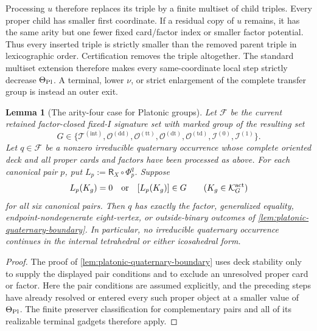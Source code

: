 \documentclass[11pt,letterpaper,onecolumn]{article}
\theoremstyle{plain}
\newtheorem{lemma}[lemma]{Lemma}
\theoremstyle{definition}
\theoremstyle{remark}
\newcommand{\cF}{\mathcal F}
\newcommand{\TetInt}{{\mathcal T^{(\mathrm{int})}}}
\newcommand{\OctDD}{{\mathcal O^{(\mathrm{dd})}}}
\newcommand{\OctTT}{{\mathcal O^{(\mathrm{tt})}}}
\newcommand{\OctDT}{{\mathcal O^{(\mathrm{dt})}}}
\newcommand{\OctTD}{{\mathcal O^{(\mathrm{td})}}}
\newcommand{\IcoZero}{{\mathcal I^{(0)}}}
\newcommand{\IcoOne}{{\mathcal I^{(1)}}}
\begin{document}
Processing \(u\) therefore replaces its triple by a finite multiset of
child triples.  Every proper child has smaller first coordinate. If a
residual copy of \(u\) remains, it has the same arity but one fewer fixed
card/factor index or smaller factor potential.  Thus every inserted
triple is strictly smaller than the removed parent triple in lexicographic
order.  Certification removes the triple altogether.  The standard
multiset extension therefore makes every same-coordinate local step strictly decrease
\(\Theta_{\rm Pl}\). A terminal, lower \(\nu\), or strict enlargement of the complete transfer group is instead an outer exit.

\begin{lemma}[The arity-four case for Platonic groups]
\label{lem:platonic-prepared-q4}
Let \(\cF\) be the current retained factor-closed fixed-\(I\)
signature set with marked group of the resulting set
\[
 G\in\{\TetInt,\OctDD,\OctTT,\OctDT,
          \OctTD,\IcoZero,\IcoOne\}.
\]
Let \(q\in\cF\) be a nonzero irreducible quaternary occurrence whose
complete oriented deck and all proper cards and factors have been processed
as above.
For each canonical pair \(p\), put
\(L_p:=\mathsf R_X\circ\Phi_p^q\).  Suppose
\[
 L_p(K_g)=0\quad\text{or}\quad [L_p(K_g)]\in G
 \qquad
 (K_g\in\mathcal K_G^{\rm act})
\]
for all six canonical pairs.  Then \(q\) has exactly the factor, generalized
equality, endpoint-nondegenerate eight-vertex, or outside-binary outcomes of
\cref{lem:platonic-quaternary-boundary}. In particular, no irreducible
quaternary occurrence continues in the internal tetrahedral or either
icosahedral form.
\end{lemma}

\begin{proof}
The proof of \cref{lem:platonic-quaternary-boundary} uses deck stability
only to supply the displayed pair conditions and to exclude an unresolved
proper card or factor.  Here the pair conditions are assumed explicitly,
and the preceding steps have already resolved or entered every such proper object at
a smaller value of \(\Theta_{\rm Pl}\). The finite preserver classification
for complementary pairs and all of its realizable terminal gadgets therefore apply.
\end{proof}
\end{document}
